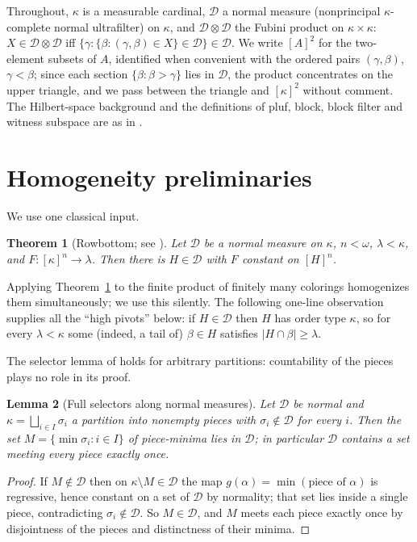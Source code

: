 \documentclass[11pt]{article}
\newtheorem{theorem}{Theorem}[section]
\newtheorem{lemma}[theorem]{Lemma}
\theoremstyle{definition}
\newcommand{\D}{\mathcal{D}}
\begin{document}
Throughout, $\kappa$ is a measurable cardinal, $\D$ a normal measure
(nonprincipal $\kappa$-complete normal ultrafilter) on $\kappa$, and
$\D\otimes\D$ the Fubini product on $\kappa\times\kappa$:
$X\in\D\otimes\D$ iff $\{\gamma:\{\beta:(\gamma,\beta)\in X\}\in\D\}\in\D$.
We write $[A]^2$ for the two-element subsets of $A$, identified when
convenient with the ordered pairs $(\gamma,\beta)$, $\gamma<\beta$; since
each section $\{\beta:\beta>\gamma\}$ lies in $\D$, the product concentrates
on the upper triangle, and we pass between the triangle and $[\kappa]^2$
without comment. The Hilbert-space background and the definitions of pluf,
block, block filter and witness subspace are as in \cite{FWI,FWII,FWIII}.

\section{Homogeneity preliminaries}\label{sec:prelim}

We use one classical input.

\begin{theorem}[Rowbottom; see {\cite[Theorem 7.17]{Kanamori}}]
\label{thm:rowbottom}
Let $\D$ be a normal measure on $\kappa$, $n<\omega$, $\lambda<\kappa$, and
$F:[\kappa]^n\to\lambda$. Then there is $H\in\D$ with $F$ constant on
$[H]^n$.
\end{theorem}

Applying Theorem~\ref{thm:rowbottom} to the finite product of finitely many
colorings homogenizes them simultaneously; we use this silently. The
following one-line observation supplies all the ``high pivots'' below: if
$H\in\D$ then $H$ has order type $\kappa$, so for every $\lambda<\kappa$
some (indeed, a tail of) $\beta\in H$ satisfies
$|H\cap\beta|\ge\lambda$.

The selector lemma of \cite{FWIII} holds for arbitrary partitions:
countability of the pieces plays no role in its proof.

\begin{lemma}[Full selectors along normal measures]\label{lem:full-selector}
Let $\D$ be normal and $\kappa=\bigsqcup_{i\in I}\sigma_i$ a partition into
nonempty pieces with $\sigma_i\notin\D$ for every $i$. Then the set
$M=\{\min\sigma_i:i\in I\}$ of piece-minima lies in $\D$; in particular
$\D$ contains a set meeting every piece exactly once.
\end{lemma}

\begin{proof}
If $M\notin\D$ then on $\kappa\setminus M\in\D$ the map
$g(\alpha)=\min(\text{piece of }\alpha)$ is regressive, hence constant on a
set of $\D$ by normality; that set lies inside a single piece,
contradicting $\sigma_i\notin\D$. So $M\in\D$, and $M$ meets each piece
exactly once by disjointness of the pieces and distinctness of their
minima.
\end{proof}
\end{document}
